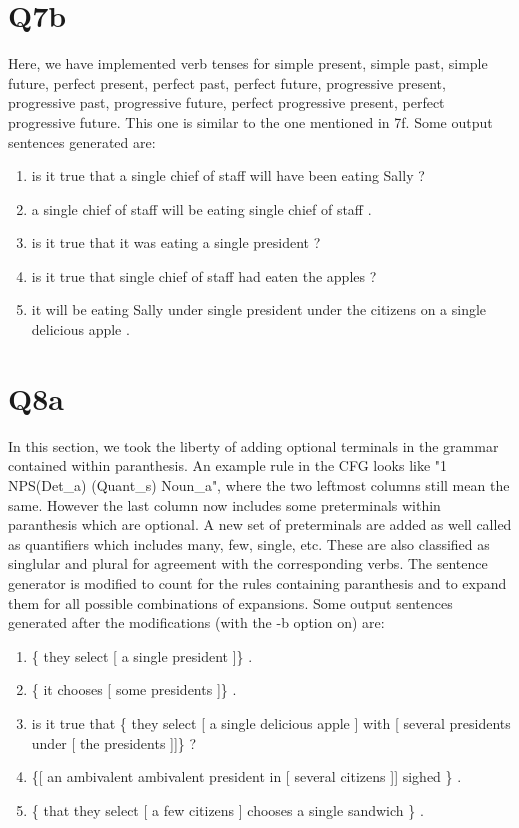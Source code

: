 \documentclass[12pt]{article}
\begin{document}
\section*{Q7b}
Here, we have implemented verb tenses for simple present, simple past, simple future, perfect present, perfect past, perfect future, progressive present, progressive past, progressive future, perfect progressive present, perfect progressive future. This one is similar to the one mentioned in 7f. Some output sentences generated are:\\
\begin{enumerate}
	\item is  it  true  that  a  single  chief  of  staff  will  have  been  eating  Sally  ?
	\item a  single  chief  of  staff  will  be  eating  single  chief  of  staff  . 
	\item is  it  true  that  it  was  eating  a  single  president  ? 
	\item is  it  true  that  single  chief  of  staff  had  eaten  the  apples  ? 
	\item it  will  be  eating  Sally  under  single  president  under  the  citizens  on  a  single  delicious  apple  .
\end{enumerate}
\pagebreak
\section*{Q8a}
In this section, we took the liberty of adding optional terminals in the grammar contained within paranthesis. An example rule in the CFG looks like "1\hspace{1cm} NPS\hspace{1cm}(Det\_a) (Quant\_s) Noun\_a", where the two leftmost columns still mean the same. However the last column now includes some preterminals within paranthesis which are optional. A new set of preterminals are added as well called as quantifiers which includes many, few, single, etc. These are also classified as singlular and plural for agreement with the corresponding verbs. The sentence generator is modified to count for the rules containing paranthesis and to expand them for all possible combinations of expansions. Some output sentences generated after the modifications (with the -b option on) are:\\
\begin{enumerate}
	\item \{ they  select [ a  single  president ]\} . 
	\item \{ it  chooses [ some  presidents ]\} .
	\item is  it  true  that \{ they  select [ a  single  delicious  apple ] with [ several  presidents  under [ the  presidents ]]\} ?
	\item \{[ an  ambivalent  ambivalent  president  in [ several  citizens ]] sighed \} .
	\item \{ that { they  select [ a  few  citizens ]} chooses  a  single  sandwich \} .
\end{enumerate}
\end{document}

